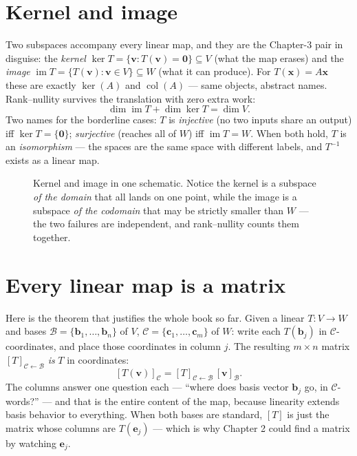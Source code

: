 \section{Kernel and image}\label{sec:kerim}

Two subspaces accompany every linear map, and they are the Chapter-3 pair in disguise: the \emph{kernel} $\ker T=\{\mathbf v:T(\mathbf v)=\mathbf 0\}\subseteq V$ (what the map erases) and the \emph{image} $\operatorname{im}T=\{T(\mathbf v):\mathbf v\in V\}\subseteq W$ (what it can produce). For $T(\mathbf x)=A\mathbf x$ these are exactly $\ker(A)$ and $\operatorname{col}(A)$ — same objects, abstract names. Rank--nullity survives the translation with zero extra work:
\[
  \dim\operatorname{im}T + \dim\ker T = \dim V.
\]
Two names for the borderline cases: $T$ is \emph{injective} (no two inputs share an output) iff $\ker T=\{\mathbf 0\}$; \emph{surjective} (reaches all of $W$) iff $\operatorname{im}T=W$. When both hold, $T$ is an \emph{isomorphism} — the spaces are the same space with different labels, and $T^{-1}$ exists as a linear map.

\begin{figure}[htbp]
\centering

\caption{Kernel and image in one schematic. Notice the kernel is a subspace \emph{of the domain} that all lands on one point, while the image is a subspace \emph{of the codomain} that may be strictly smaller than $W$ — the two failures are independent, and rank--nullity counts them together.}
\label{fig:kerim}
\end{figure}

\section{Every linear map is a matrix}\label{sec:matrixrep}

Here is the theorem that justifies the whole book so far. Given a linear $T:V\to W$ and bases $\mathcal B=\{\mathbf b_1,\dots,\mathbf b_n\}$ of $V$, $\mathcal C=\{\mathbf c_1,\dots,\mathbf c_m\}$ of $W$: write each $T(\mathbf b_j)$ in $\mathcal C$-coordinates, and place those coordinates in column $j$. The resulting $m\times n$ matrix $[T]_{\mathcal{C}\leftarrow\mathcal{B}}$ \emph{is} $T$ in coordinates:
\[
  [T(\mathbf v)]_{\mathcal C} = [T]_{\mathcal{C}\leftarrow\mathcal{B}}\,[\mathbf v]_{\mathcal B}.
\]
The columns answer one question each — ``where does basis vector $\mathbf b_j$ go, in $\mathcal C$-words?'' — and that is the entire content of the map, because linearity extends basis behavior to everything. When both bases are standard, $[T]$ is just the matrix whose columns are $T(\mathbf e_j)$ — which is why Chapter 2 could find a matrix by watching $\mathbf e_j$.

